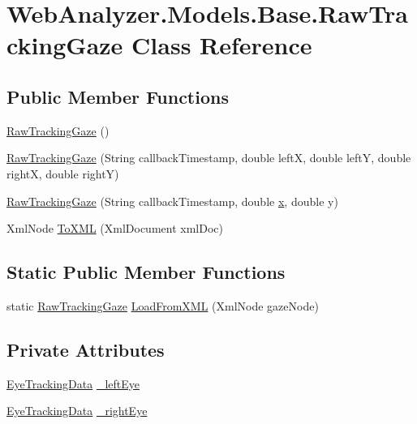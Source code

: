 \hypertarget{class_web_analyzer_1_1_models_1_1_base_1_1_raw_tracking_gaze}{}\section{Web\+Analyzer.\+Models.\+Base.\+Raw\+Tracking\+Gaze Class Reference}
\label{class_web_analyzer_1_1_models_1_1_base_1_1_raw_tracking_gaze}
\subsection*{Public Member Functions}
\begin{DoxyCompactItemize}
\item 
\hyperlink{class_web_analyzer_1_1_models_1_1_base_1_1_raw_tracking_gaze_a5fa23875741ccd08b26a5b66721f3822}{Raw\+Tracking\+Gaze} ()
\item 
\hyperlink{class_web_analyzer_1_1_models_1_1_base_1_1_raw_tracking_gaze_aee3cb8f5c49db66f263ee59794f04ed3}{Raw\+Tracking\+Gaze} (String callback\+Timestamp, double left\+X, double left\+Y, double right\+X, double right\+Y)
\item 
\hyperlink{class_web_analyzer_1_1_models_1_1_base_1_1_raw_tracking_gaze_a61c044da6ea2f9734583f0896d13d983}{Raw\+Tracking\+Gaze} (String callback\+Timestamp, double \hyperlink{_u_i_2_h_t_m_l_resources_2js_2lib_2underscore_8min_8js_a81e910173af87b1161e719a504d52407}{x}, double y)
\item 
Xml\+Node \hyperlink{class_web_analyzer_1_1_models_1_1_base_1_1_raw_tracking_gaze_a0de790ba2edb091bde241007be981427}{To\+X\+M\+L} (Xml\+Document xml\+Doc)
\end{DoxyCompactItemize}
\subsection*{Static Public Member Functions}
\begin{DoxyCompactItemize}
\item 
static \hyperlink{class_web_analyzer_1_1_models_1_1_base_1_1_raw_tracking_gaze}{Raw\+Tracking\+Gaze} \hyperlink{class_web_analyzer_1_1_models_1_1_base_1_1_raw_tracking_gaze_a2a7621cda0221f638008c67561d17f3a}{Load\+From\+X\+M\+L} (Xml\+Node gaze\+Node)
\end{DoxyCompactItemize}
\subsection*{Private Attributes}
\begin{DoxyCompactItemize}
\item 
\hyperlink{class_web_analyzer_1_1_models_1_1_data_model_1_1_eye_tracking_data}{Eye\+Tracking\+Data} \hyperlink{class_web_analyzer_1_1_models_1_1_base_1_1_raw_tracking_gaze_a37ae5430421d7d8e9ff864f2b0091361}{\+\_\+left\+Eye}
\item 
\hyperlink{class_web_analyzer_1_1_models_1_1_data_model_1_1_eye_tracking_data}{Eye\+Tracking\+Data} \hyperlink{class_web_analyzer_1_1_models_1_1_base_1_1_raw_tracking_gaze_a7c6004bf1c5302f318f13e1f98838ee3}{\+\_\+right\+Eye}
\end{DoxyCompactItemize}


